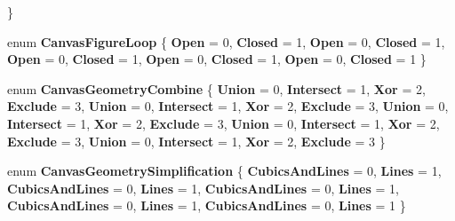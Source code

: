 \begin{DoxyCompactItemize}
 \}
\item 
\mbox{\label{namespace_microsoft_1_1_graphics_1_1_canvas_1_1_geometry_a28bf1d65eb419d2a2015efc91bb9741c}} 
enum {\bfseries Canvas\+Figure\+Loop} \{ \newline
{\bfseries Open} = 0, 
{\bfseries Closed} = 1, 
{\bfseries Open} = 0, 
{\bfseries Closed} = 1, 
\newline
{\bfseries Open} = 0, 
{\bfseries Closed} = 1, 
{\bfseries Open} = 0, 
{\bfseries Closed} = 1, 
\newline
{\bfseries Open} = 0, 
{\bfseries Closed} = 1
 \}
\item 
\mbox{\label{namespace_microsoft_1_1_graphics_1_1_canvas_1_1_geometry_a8aee93f6169d213f64028a369522c8bb}} 
enum {\bfseries Canvas\+Geometry\+Combine} \{ \newline
{\bfseries Union} = 0, 
{\bfseries Intersect} = 1, 
{\bfseries Xor} = 2, 
{\bfseries Exclude} = 3, 
\newline
{\bfseries Union} = 0, 
{\bfseries Intersect} = 1, 
{\bfseries Xor} = 2, 
{\bfseries Exclude} = 3, 
\newline
{\bfseries Union} = 0, 
{\bfseries Intersect} = 1, 
{\bfseries Xor} = 2, 
{\bfseries Exclude} = 3, 
\newline
{\bfseries Union} = 0, 
{\bfseries Intersect} = 1, 
{\bfseries Xor} = 2, 
{\bfseries Exclude} = 3, 
\newline
{\bfseries Union} = 0, 
{\bfseries Intersect} = 1, 
{\bfseries Xor} = 2, 
{\bfseries Exclude} = 3
 \}
\item 
\mbox{\label{namespace_microsoft_1_1_graphics_1_1_canvas_1_1_geometry_a2ce59b66d6d8d5be54c22ba03d885c82}} 
enum {\bfseries Canvas\+Geometry\+Simplification} \{ \newline
{\bfseries Cubics\+And\+Lines} = 0, 
{\bfseries Lines} = 1, 
{\bfseries Cubics\+And\+Lines} = 0, 
{\bfseries Lines} = 1, 
\newline
{\bfseries Cubics\+And\+Lines} = 0, 
{\bfseries Lines} = 1, 
{\bfseries Cubics\+And\+Lines} = 0, 
{\bfseries Lines} = 1, 
\newline
{\bfseries Cubics\+And\+Lines} = 0, 
{\bfseries Lines} = 1
 \}
\item 
\mbox{\label{namespace_microsoft_1_1_graphics_1_1_canvas_1_1_geometry_abb27c8fb8d2b8f00eb3225ac6f3531e3}} 

\end{DoxyCompactItemize}

